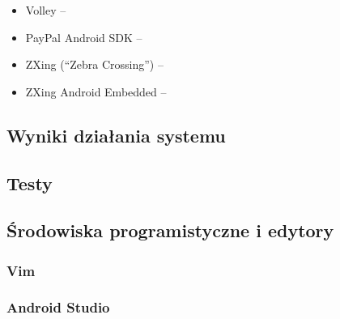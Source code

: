 \begin{singlespace}
	\vspace{0.3cm}
	\inputminted[fontsize=\footnotesize, linenos=true]{java}{src/imp/payment-result.java}
\end{singlespace}



\begin{itemize}
	\item Volley --
	\item PayPal Android SDK --
	\item ZXing (``Zebra Crossing'') --
	\item ZXing Android Embedded --
\end{itemize}

\subsection{Wyniki działania systemu}

\subsection{Testy}

\subsection{Środowiska programistyczne i edytory}
\subsubsection*{Vim}
\subsubsection*{Android Studio}
